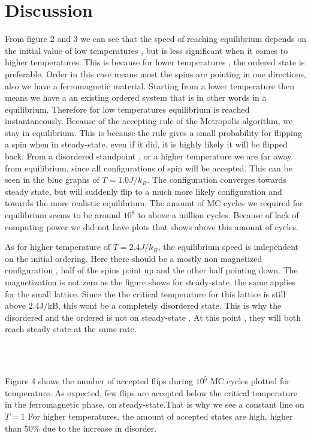 \documentclass{article}
\begin{document}
\section{Discussion}
From figure 2 and 3 we can see that the speed of reaching equilibrium depends on the initial value of low temperatures , but is less significant when it comes to higher temperatures. This is because for lower temperatures , the ordered state is preferable. Order in this case means most the spins are pointing in one directions, also we have a ferromagnetic material. Starting from a lower temperature then means we have a an existing ordered system that is in other words in a equilibrium. Therefore for low temperatures equilibrium is reached instantaneously. Because of the accepting rule of the Metropolis algorithm, we stay in equilibrium. This is because the rule gives a small probability for flipping a spin when in steady-state, even if it did, it is highly likely it will be flipped back.  From a disordered standpoint , or a higher temperature we are far away from equilibrium, since all configurations of spin will be accepted. This can be seen in the blue graphs of  $T = 1.0J/k_B$. The configuration converges towards steady state, but will suddenly flip to a much more likely configuration and towards the more realistic equilibrium. The amount of MC cycles we required for equilibrium seems to be around $10^8$ to above a million cycles. Because of lack of computing power we did not have plots that shows above this amount of cycles.

As for higher temperature of $T = 2.4J/k_B$, the equilibrium speed is independent on the initial ordering. Here there should be a mostly non magnetized configuration , half of the spins point up and the other half pointing down. The magnetization is not zero as the figure shows for steady-state, the same applies for the small lattice. Since the the critical temperature for this lattice is still above  2.4J/kB, this wont be a completely disordered state. This is why the disordered and the ordered is not on steady-state . At this point , they will both reach steady state at the same rate.

 \\\



Figure 4 shows the number of accepted flips during $10^5$ MC cycles plotted for temperature. As expected, few flips are accepted below the critical temperature in the ferromagnetic phase, on steady-state.That is why we see a constant line on $T=1$ For higher temperatures, the amount of accepted states are high, higher than $50\%$ due to the increase in disorder.\\\
\end{document}
